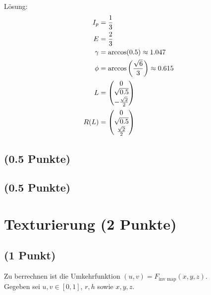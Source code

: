 \documentclass[a4paper,10pt,DIV=14]{article}
\begin{document}
Lösung:
\begin{align*}
I_p &= \frac{1}{3}\\
E &= \frac{2}{3} \\
\gamma &= \arccos(0.5) \approx 1.047\\
\phi &= \arccos\left(\frac{\sqrt{6}}{3}\right) \approx 0.615 \\
L &=  \begin{pmatrix} 0 \\ \sqrt{0.5} \\ -\frac{\sqrt{2}}{2} \end{pmatrix} \\
R(L) &= \begin{pmatrix} 0 \\ \sqrt{0.5} \\ \frac{\sqrt{2}}{2} \end{pmatrix}\\
\end{align*}

\subsection{(0.5 Punkte)} %
\subsection{(0.5 Punkte)}



\clearpage
\section{Texturierung (2 Punkte)} %

\subsection{(1 Punkt)} %


Zu berrechnen ist die Umkehrfunktion $(u,v) = F_{\text{inv map}}(x,y,z)$.\\

Gegeben sei $u,v \in [0,1]$, $r, h$ sowie $x,y,z$.\\
\end{document}
